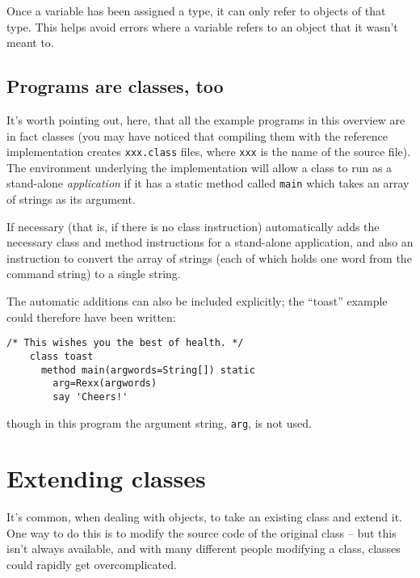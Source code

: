 Once a variable has been assigned a type, it can only refer to objects of that type. This helps avoid errors where a variable refers to an object that it wasn’t meant to.
\subsection{Programs are classes, too}
It’s worth pointing out, here, that all the example programs in this overview are in fact classes (you may have noticed that compiling them with the reference implementation creates \texttt{xxx.class} files, where \texttt{xxx} is the name of the source file). The environment underlying the implementation will allow a class to run as a stand-alone \emph{application} if it has a static method called \texttt{main} which takes an array of strings as its argument.

If necessary (that is, if there is no class instruction) \nr{} automatically adds the necessary class and method instructions for a stand-alone application, and also an instruction to convert the array of strings (each of which holds one word from the command string) to a single \nr{} string.

The automatic additions can also be included explicitly; the “toast”
example could therefore have been written:
\begin{lstlisting}[label=toast,caption=New Toast]
    /* This wishes you the best of health. */
    class toast
      method main(argwords=String[]) static
        arg=Rexx(argwords)
        say 'Cheers!'
\end{lstlisting}
though in this program the argument string, \texttt{arg}, is not used.
\section{Extending classes}
It’s common, when dealing with objects, to take an existing class and extend it. One way to do this is to modify the source code of the original class – but this isn’t always available, and with many different people modifying a class, classes could rapidly get overcomplicated.

